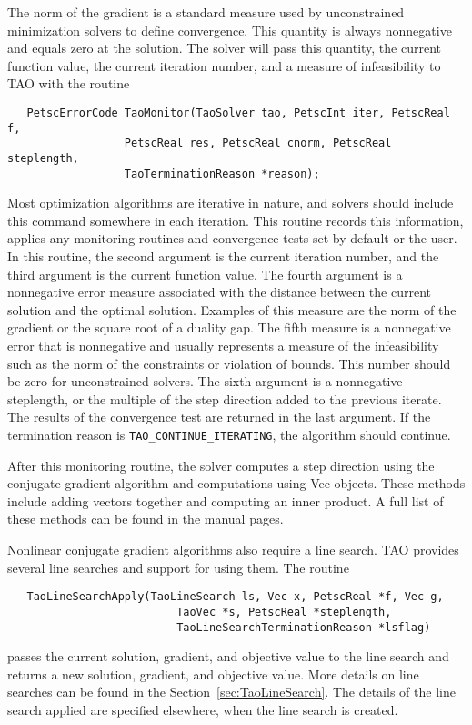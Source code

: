 The norm of the gradient is a standard measure used
by unconstrained minimization solvers to define convergence.
This quantity is always nonnegative and equals zero at the solution.  
The solver will pass this quantity, the current
function value, the current iteration number, and a measure of
infeasibility to TAO with the routine
\begin{verbatim}
   PetscErrorCode TaoMonitor(TaoSolver tao, PetscInt iter, PetscReal f,
                  PetscReal res, PetscReal cnorm, PetscReal steplength,
                  TaoTerminationReason *reason);
\end{verbatim}
Most optimization algorithms are iterative in nature, and solvers should
include this command somewhere in each iteration.  This routine
records this information, applies any monitoring routines and 
convergence tests set by default or the user.
In this routine, the second argument is the current
iteration number, and the third argument is the current function value.
The fourth argument is a nonnegative error measure associated with the
distance between the current solution and the optimal solution.  Examples
of this measure are the norm of the gradient or the square root of a duality 
gap. The fifth measure is a nonnegative error 
that is nonnegative and usually
represents a measure of the infeasibility
such as the norm of the constraints or violation of bounds.
This number should be zero for unconstrained solvers.
The sixth argument is a nonnegative steplength, 
or the multiple of the step direction added to the previous iterate.
The results of the convergence test are returned in the last argument.
If the termination reason is {\tt TAO\_CONTINUE\_ITERATING}, the
algorithm should continue.

After this monitoring routine, the solver computes a step direction
using the conjugate gradient algorithm and computations using Vec objects.  
These methods include
adding vectors together and computing an inner product.  A full list
of these methods can be found in the manual pages.

Nonlinear conjugate gradient algorithms also require a line search.  TAO
provides several line searches and support for using them.
The routine
\begin{verbatim}
   TaoLineSearchApply(TaoLineSearch ls, Vec x, PetscReal *f, Vec g, 
                          TaoVec *s, PetscReal *steplength, 
                          TaoLineSearchTerminationReason *lsflag)
\end{verbatim}
passes the current solution, gradient, and objective value to the
line search and returns a new solution, gradient, and objective value.  More
details on line searches can be found in the Section~\ref{sec:TaoLineSearch}.
The details of the line search applied are specified elsewhere, when
the line search is created.


